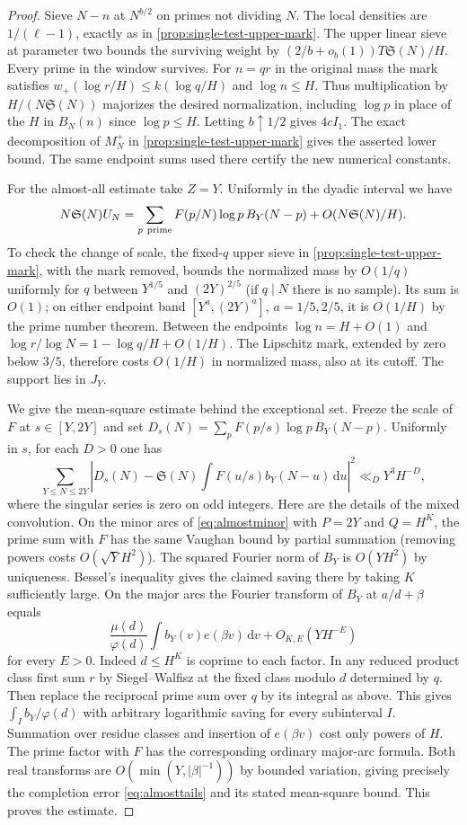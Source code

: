 \documentclass[11pt,a4paper]{article}
\numberwithin{equation}{section}
\newcommand{\SSS}{\mathfrak S}
\newcommand{\ud}{\mathrm d}
\begin{document}
\begin{proof}
Sieve $N-n$ at $N^{b/2}$ on primes not dividing $N$.
The local densities are $1/(\ell-1)$, exactly as in
\cref{prop:single-test-upper-mark}. The upper linear sieve at
parameter two bounds the surviving weight by
$(2/b+o_b(1))T\SSS(N)/H$. Every prime in the window survives.
For $n=qr$ in the original mass the mark satisfies
$w_+(\log r/H)\le k(\log q/H)$ and $\log n\le H$.
Thus multiplication by $H/(N\SSS(N))$ majorizes the desired
normalization, including $\log p$ in place of the $H$ in $B_N(n)$
since $\log p\le H$. Letting $b\uparrow1/2$ gives $4cI_1$.
The exact decomposition of $M_N^+$ in
\cref{prop:single-test-upper-mark} gives the asserted lower bound.
The same endpoint sums used there certify the new numerical constants.

For the almost-all estimate take $Z=Y$. Uniformly in the dyadic
interval we have
\begin{equation}
 N\SSS(N)U_N=
 \sum_{p\ {\rm prime}} F(p/N)\log p\,B_Y(N-p)
       +O(N\SSS(N)/H).
 \label{eq:single-test-semiprime-freeze}
\end{equation}
To check the change of scale, the fixed-$q$ upper sieve in
\cref{prop:single-test-upper-mark}, with the mark removed,
bounds the normalized mass by $O(1/q)$ uniformly for
$q$ between $Y^{1/5}$ and $(2Y)^{2/5}$ (if $q\mid N$ there
is no sample). Its sum is $O(1)$; on either endpoint band
$[Y^a,(2Y)^a]$, $a=1/5,2/5$, it is $O(1/H)$ by the prime
number theorem. Between the endpoints $\log n=H+O(1)$ and
$\log r/\log N=1-\log q/H+O(1/H)$. The Lipschitz mark,
extended by zero below $3/5$, therefore costs $O(1/H)$ in
normalized mass, also at its cutoff. The support lies in $J_Y$.

We give the mean-square estimate behind the exceptional set.
Freeze the scale of $F$ at $s\in[Y,2Y]$ and set
$D_s(N)=\sum_p F(p/s)\log p\,B_Y(N-p)$. Uniformly in $s$,
for each $D>0$ one has
\[
 \sum_{Y\le N\le2Y}\left|D_s(N)
 -\SSS(N)\int F(u/s)b_Y(N-u)\,\ud u\right|^2
       \ll_D Y^3 H^{-D},
\]
where the singular series is zero on odd integers.
Here are the details of the mixed convolution. On the minor arcs
of \eqref{eq:almostminor} with $P=2Y$ and $Q=H^K$, the prime
sum with $F$ has the same Vaughan bound by partial summation
(removing powers costs $O(\sqrt Y H^2)$).
The squared Fourier norm of $B_Y$ is $O(YH^2)$ by uniqueness.
Bessel's inequality gives the claimed saving there by taking
$K$ sufficiently large. On the major arcs the Fourier transform
of $B_Y$ at $a/d+\beta$ equals
\[
 \frac{\mu(d)}{\varphi(d)}\int b_Y(v)e(\beta v)\,\ud v
     +O_{K,E}(YH^{-E})
\]
for every $E>0$. Indeed $d\le H^K$ is coprime to each factor.
In any reduced product class first sum $r$ by Siegel--Walfisz
at the fixed class modulo $d$ determined by $q$. Then replace
the reciprocal prime sum over $q$ by its integral as above.
This gives $\int_I b_Y/\varphi(d)$ with arbitrary logarithmic
saving for every subinterval $I$. Summation over residue classes
and insertion of $e(\beta v)$ cost only powers of $H$. The prime
factor with $F$ has the corresponding ordinary major-arc formula.
Both real transforms are $O(\min(Y,|\beta|^{-1}))$ by bounded
variation, giving precisely the completion error
\eqref{eq:almosttails} and its stated mean-square bound.
This proves the estimate.


\end{proof}
\end{document}
